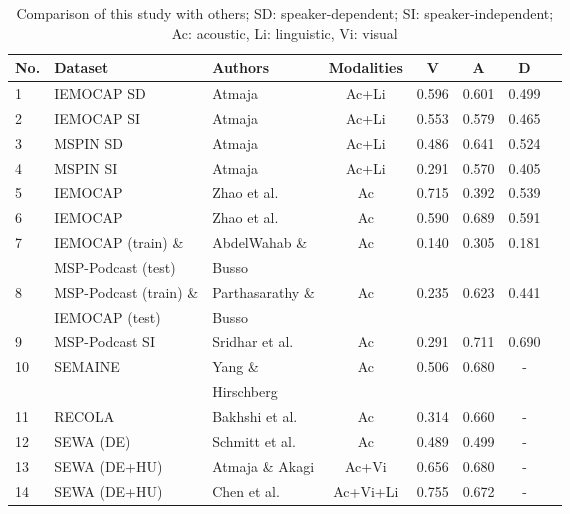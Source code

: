 \begin{table}[htbp]
    \caption{Comparison of this study with others; SD: speaker-dependent; SI: speaker-independent; Ac: acoustic, Li: linguistic, Vi: visual}
    \begin{center}
    \begin{tabular}{p{.3cm} l l c c c c c}
    \hline
    No. & Dataset & Authors   &   Modalities    & V     &   A   &   D \\
    \hline
    \hline
    1 & IEMOCAP SD  & Atmaja &  Ac+Li & 0.596 & 0.601 & 0.499 \\
    2 & IEMOCAP SI  & Atmaja &  Ac+Li & 0.553 & 0.579 & 0.465 \\
    3 & MSPIN SD    & Atmaja &  Ac+Li & 0.486 & 0.641 & 0.524 \\
    4 & MSPIN SI    & Atmaja &  Ac+Li & 0.291 & 0.570 & 0.405 \\
    5 & IEMOCAP     & Zhao et al. \cite{Zhao2018a}  & Ac  & 0.715 & 0.392 & 0.539 \\
6 & IEMOCAP     & Zhao et al. \cite{Zhao2019}   & Ac & 0.590 & 0.689
& 0.591 \\
7 & IEMOCAP (train) \&  & AbdelWahab \&  & Ac  & 0.140	
& 0.305	& 0.181 \\
 & MSP-Podcast (test) & Busso \cite{Abdelwahab2018}\\
8 & MSP-Podcast (train) \&  & Parthasarathy \& & Ac & 0.235	& 0.623	& 0.441 \\
 & IEMOCAP (test)  & Busso \cite{Parthasarathy2019} \\
9 & MSP-Podcast SI & Sridhar et al. \cite{Sridhar2018} & Ac  & 
0.291	& 0.711    & 0.690 \\
10 & SEMAINE	& Yang \&	& Ac	& 0.506	& 0.680	& - \\
& & Hirschberg \cite{Yang2018} \\
11 & RECOLA & Bakhshi et al. \cite{Bakhshi2020} & Ac & 0.314	& 0.660	& - \\
12 & SEWA (DE)	& Schmitt et al. \cite{Schmitt2018}	& Ac & 0.489 & 0.499 & - \\
13 & SEWA (DE+HU) & Atmaja \& Akagi \cite{Atmaja2020}	& Ac+Vi	& 0.656	& 
0.680 & - \\
14 & SEWA (DE+HU)    & Chen et al. \cite{chen2017multimodal}	& Ac+Vi+Li & 
0.755 & 0.672 & - \\
    \hline
    \end{tabular}
    \end{center}
    \label{tab:compare}
\end{table}

